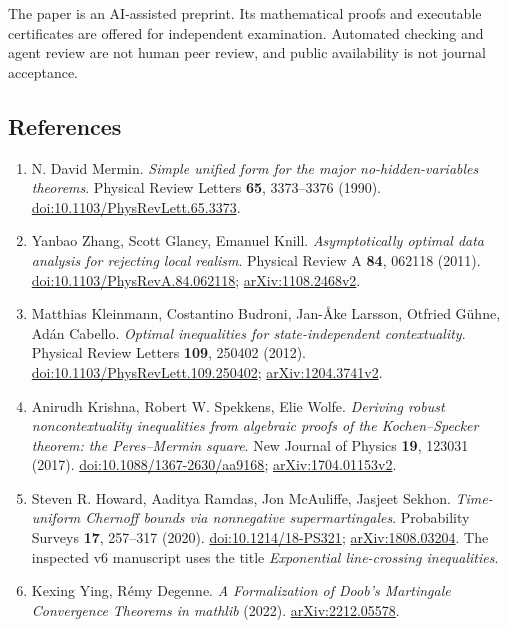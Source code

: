 \documentclass[10pt,a4paper]{article}
\begin{document}
The paper is an AI-assisted preprint. Its mathematical proofs and
executable certificates are offered for independent examination.
Automated checking and agent review are not human peer review, and
public availability is not journal acceptance.

\subsection{References}\label{references}

\begin{enumerate}
\def\labelenumi{\arabic{enumi}.}
\item
  N. David Mermin. \emph{Simple unified form for the major
  no-hidden-variables theorems}. Physical Review Letters \textbf{65},
  3373--3376 (1990).
  \href{https://doi.org/10.1103/PhysRevLett.65.3373}{doi:10.1103/PhysRevLett.65.3373}.
\item
  Yanbao Zhang, Scott Glancy, Emanuel Knill. \emph{Asymptotically
  optimal data analysis for rejecting local realism}. Physical Review A
  \textbf{84}, 062118 (2011).
  \href{https://doi.org/10.1103/PhysRevA.84.062118}{doi:10.1103/PhysRevA.84.062118};
  \href{https://arxiv.org/abs/1108.2468v2}{arXiv:1108.2468v2}.
\item
  Matthias Kleinmann, Costantino Budroni, Jan-Åke Larsson, Otfried
  Gühne, Adán Cabello. \emph{Optimal inequalities for state-independent
  contextuality}. Physical Review Letters \textbf{109}, 250402 (2012).
  \href{https://doi.org/10.1103/PhysRevLett.109.250402}{doi:10.1103/PhysRevLett.109.250402};
  \href{https://arxiv.org/abs/1204.3741v2}{arXiv:1204.3741v2}.
\item
  Anirudh Krishna, Robert W. Spekkens, Elie Wolfe. \emph{Deriving robust
  noncontextuality inequalities from algebraic proofs of the
  Kochen--Specker theorem: the Peres--Mermin square}. New Journal of
  Physics \textbf{19}, 123031 (2017).
  \href{https://doi.org/10.1088/1367-2630/aa9168}{doi:10.1088/1367-2630/aa9168};
  \href{https://arxiv.org/abs/1704.01153v2}{arXiv:1704.01153v2}.
\item
  Steven R. Howard, Aaditya Ramdas, Jon McAuliffe, Jasjeet Sekhon.
  \emph{Time-uniform Chernoff bounds via nonnegative supermartingales}.
  Probability Surveys \textbf{17}, 257--317 (2020).
  \href{https://doi.org/10.1214/18-PS321}{doi:10.1214/18-PS321};
  \href{https://arxiv.org/abs/1808.03204}{arXiv:1808.03204}. The
  inspected v6 manuscript uses the title \emph{Exponential line-crossing
  inequalities}.
\item
  Kexing Ying, Rémy Degenne. \emph{A Formalization of Doob's Martingale
  Convergence Theorems in mathlib} (2022).
  \href{https://arxiv.org/abs/2212.05578}{arXiv:2212.05578}.
\end{enumerate}
\end{document}
